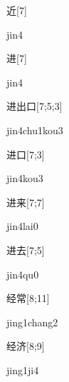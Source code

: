 \begin{verbete}[jin4]{近}[7]
\begin{pronuncia}{jin4}
\end{pronuncia}
\end{verbete}

\begin{verbete}[jin4]{进}[7]
\begin{pronuncia}{jin4}
\end{pronuncia}
\end{verbete}

\begin{verbete}{进出口}[7;5;3]
\begin{pronuncia}{jin4chu1kou3}
\end{pronuncia}
\end{verbete}

\begin{verbete}{进口}[7;3]
\begin{pronuncia}{jin4kou3}
\end{pronuncia}
\end{verbete}

\begin{verbete}{进来}[7;7]
\begin{pronuncia}{jin4lai0}
\end{pronuncia}
\end{verbete}

\begin{verbete}[jin4qu0]{进去}[7;5]
\begin{pronuncia}{jin4qu0}
\end{pronuncia}
\end{verbete}

\begin{verbete}{经常}[8;11]
\begin{pronuncia}{jing1chang2}
\end{pronuncia}
\end{verbete}

\begin{verbete}[jing1ji4]{经济}[8;9]
\begin{pronuncia}{jing1ji4}
\end{pronuncia}
\end{verbete}

